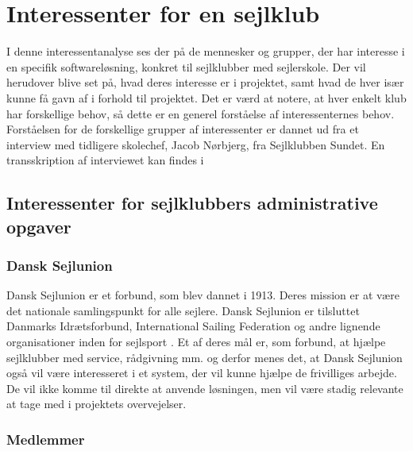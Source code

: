 \chapter{Interessenter for en sejlklub}\label{chap:interessent-analyse-ved-sejlklubber}

I denne interessentanalyse ses der på de mennesker og grupper, der har interesse i en specifik softwareløsning, konkret til sejlklubber med sejlerskole.
Der vil herudover blive set på, hvad deres interesse er i projektet, samt hvad de hver især kunne få gavn af i forhold til projektet.
Det er værd at notere, at hver enkelt klub har forskellige behov, så dette er en generel forståelse af interessenternes behov.
Forståelsen for de forskellige grupper af interessenter er dannet ud fra et interview med tidligere skolechef, Jacob Nørbjerg, fra Sejlklubben Sundet. En transskription af interviewet kan findes i  


\section{Interessenter for sejlklubbers administrative opgaver}

\subsection{Dansk Sejlunion}

Dansk Sejlunion er et forbund, som blev dannet i 1913. Deres mission er at være det nationale samlingspunkt for alle sejlere. 
Dansk Sejlunion er tilsluttet Danmarks Idrætsforbund, International Sailing Federation og andre lignende organisationer inden for sejlsport \citep{Sejlsportdk}.
Et af deres mål er, som forbund, at hjælpe sejlklubber med service, rådgivning mm. og derfor menes det, at Dansk Sejlunion også vil være interesseret i et system, der vil kunne hjælpe de frivilliges arbejde. 
De vil ikke komme til direkte at anvende løsningen, men vil være stadig relevante at tage med i projektets overvejelser. 


\subsection{Medlemmer}\label{subsec:interessent-medlemmer}

